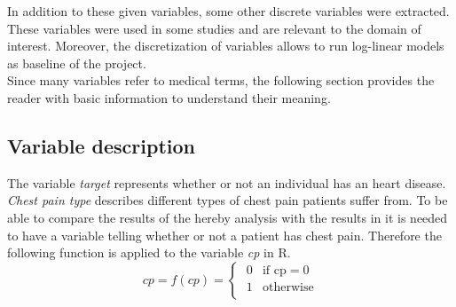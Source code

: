 \documentclass{article}
\begin{document}
In addition to these given variables, some other discrete variables were extracted. These variables were used in some studies and are relevant to the domain of interest. Moreover, the discretization of variables allows to run log-linear models as baseline of the project. \\

Since many variables refer to medical terms, the following section provides the reader with basic information to understand their meaning.

\subsection{Variable description}

The variable \textit{target} represents whether or not an individual has an heart disease. \\

\textit{Chest pain type} describes different types of chest pain patients suffer from. To be able to compare the results of the hereby analysis with the results in \cite{Steno} it is needed to have a variable telling whether or not a patient has chest pain. Therefore the following function is applied to the variable \textit{cp} in R.
\begin{equation}
    cp = f(cp) = \begin{cases}
                \;0 & \text{if cp} = 0 \\
                \; 1 & \text{otherwise} \\
                \end{cases}
\end{equation} \\
\end{document}
